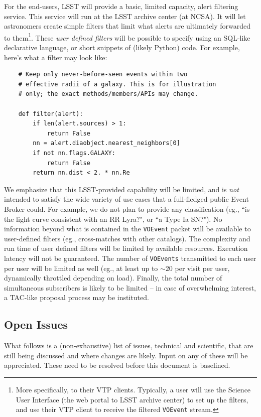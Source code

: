 \documentclass[12pt]{article}
\newcommand{\code}[1]{\texttt{#1}}
\newcommand{\VOEvent}{\code{VOEvent}\xspace}
\newcommand{\VOEvents}{\code{VOEvents}\xspace}
\begin{document}
For the end-users, LSST will provide a basic, limited capacity, alert
filtering service. This service will run at the LSST archive center (at NCSA).
It will let astronomers create simple filters that limit what alerts are
ultimately forwarded to them\footnote{More specifically, to their VTP clients.
Typically, a user will use the Science User Interface (the web portal to LSST
archive center) to set up the filters, and use their VTP client to receive the
filtered \VOEvent stream.}. These {\em user defined filters} will be possible
to specify using an SQL-like declarative language, or short snippets of
(likely Python) code. For example, here's what a filter may look like:
%
\begin{verbatim}
    # Keep only never-before-seen events within two
    # effective radii of a galaxy. This is for illustration 
    # only; the exact methods/members/APIs may change.
    
    def filter(alert):
        if len(alert.sources) > 1:
            return False
        nn = alert.diaobject.nearest_neighbors[0]
        if not nn.flags.GALAXY:
            return False
        return nn.dist < 2. * nn.Re
\end{verbatim}

We emphasize that this LSST-provided capability will be limited, and is {\em
not} intended to satisfy the wide variety of use cases that a full-fledged
public Event Broker could. For example, we do not plan to provide any
classification (eg., ``is the light curve consistent with an RR Lyra?", or ``a
Type Ia SN?"). No information beyond what is contained in the \VOEvent packet
will be available to user-defined filters (eg., cross-matches with other
catalogs). The complexity and run time of user defined filters will be limited
by available resources. Execution latency will not be guaranteed. The number
of \VOEvents transmitted to each user per user will be limited as well (eg.,
at least up to $\sim 20$ per visit per user, dynamically throttled depending
on load). Finally, the total number of simultaneous subscribers is likely to
be limited -- in case of overwhelming interest, a TAC-like proposal process
may be instituted.

\subsection{Open Issues}

What follows is a (non-exhaustive) list of issues, technical and scientific,
that are still being discussed and where changes are likely. Input on any of
these will be appreciated. These need to be resolved before this document is
baselined.
\end{document}
